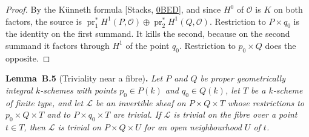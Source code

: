 \documentclass[11pt]{article}
\newenvironment{bpstatement}[2]{\par\addvspace{0.6\baselineskip}\noindent\textbf{#1}#2\textbf{.}\enspace\ignorespaces}
  {\par\addvspace{0.4\baselineskip}}
\newenvironment{bpstatementit}[2]{\begin{bpstatement}{#1}{#2}\itshape\ignorespaces}{\end{bpstatement}}
\begin{document}
\begin{proof}[{Proof}]\label{bp87}%
By the Künneth formula [Stacks, \href{https://stacks.math.columbia.edu/tag/0BED}{0BED}], and since \(H^0\) of \(\mathcal O\) is \(K\) on both factors, the source is \(\operatorname{pr}_1^*H^1(P,\mathcal O)\oplus
\operatorname{pr}_2^*H^1(Q,\mathcal O)\). Restriction to \(P\times q_0\) is the identity on the first summand. It kills the second, because on the second summand it factors through \(H^1\) of the point \(q_0\). Restriction to \(p_0\times Q\) does the opposite.
\end{proof}

\label{bp88}%
\begin{bpstatementit}{Lemma~B.5}{ (Triviality near a fibre)}
Let \(P\) and \(Q\) be proper geometrically integral \(k\)-schemes with points \(p_0\in P(k)\) and \(q_0\in Q(k)\), let \(T\) be a \(k\)-scheme of finite type, and let \(\mathcal L\) be an invertible sheaf on \(P\times Q\times T\) whose restrictions to \(p_0\times Q\times T\) and to \(P\times q_0\times T\) are trivial. If \(\mathcal L\) is trivial on the fibre over a point \(t\in T\), then \(\mathcal L\) is trivial on \(P\times Q\times U\) for an open neighbourhood \(U\) of \(t\).
\end{bpstatementit}
\end{document}
